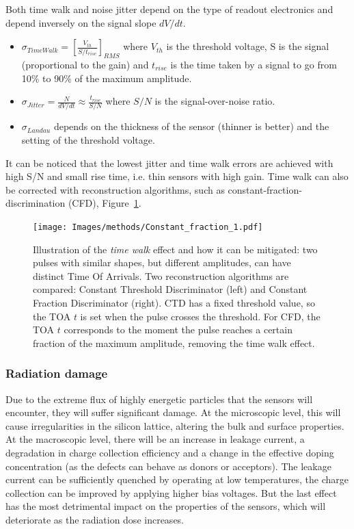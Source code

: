  Both time walk and noise jitter depend on the type of readout electronics and depend inversely on the signal slope \(dV/dt\).

\begin{itemize}
    \item \(\sigma_{TimeWalk} = \left[ \frac{V_{th}}{S/t_{rise}}\right]_{RMS}\) where \(V_{th}\) is the threshold voltage, S is the signal (proportional to the gain) and \(t_{rise}\) is the time taken by a signal to go from 10\% to 90\% of the maximum amplitude.
    \item \(\sigma_{Jitter} = \frac{N}{dV/dt} \approx \frac{t_{rise}}{S/N}\) where \(S/N\) is the signal-over-noise ratio.
    \item \(\sigma_{Landau}\) depends on the thickness of the sensor (thinner is better) and the setting of the threshold voltage.
\end{itemize}

It can be noticed that the lowest jitter and time walk errors are achieved with high S/N and small rise time, i.e. thin sensors with high gain. Time walk can also be corrected with reconstruction algorithms, such as constant-fraction-discrimination (CFD), Figure~\ref{fig:constant fraction}.

\begin{figure}[h!btp]
    \centering
    \texttt{[image: Images/methods/Constant\_fraction\_1.pdf]}
    \captionsetup{width=\captionwidth}
    \caption{Illustration of the \textit{time walk} effect and how it can be mitigated: two pulses with similar shapes, but different amplitudes, can have distinct Time Of Arrivals. Two reconstruction algorithms are compared: Constant Threshold Discriminator (left) and Constant Fraction Discriminator (right). CTD has a fixed threshold value, so the TOA \(t\) is set when the pulse crosses the threshold. For CFD, the TOA \(t\) corresponds to the moment the pulse reaches a certain fraction of the maximum amplitude, removing the time walk effect.}
    \label{fig:constant fraction}
\end{figure} 


\subsubsection{Radiation damage}

Due to the extreme flux of highly energetic particles that the sensors will encounter, they will suffer significant damage. At the microscopic level, this will cause irregularities in the silicon lattice, altering the bulk and surface properties. At the macroscopic level, there will be an increase in leakage current, a degradation in charge collection efficiency and a change in the effective doping concentration \cite{Moll:1999kv} (as the defects can behave as donors or acceptors). The leakage current can be sufficiently quenched by operating at low temperatures, the charge collection can be improved by applying higher bias voltages. But the last effect has the most detrimental impact on the properties of the sensors, which will deteriorate as the radiation dose increases.



